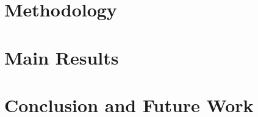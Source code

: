 \documentclass{article} %
\begin{document}
\vspace{-2mm}
\section{Methodology}
\vspace{-2mm}


\vspace{-2mm}
\section{Main Results}
\vspace{-2mm}


\vspace{-2mm}
\section{Conclusion and Future Work}
\vspace{-2mm}



% 







\newpage

\clearpage

\appendix









\end{document}
